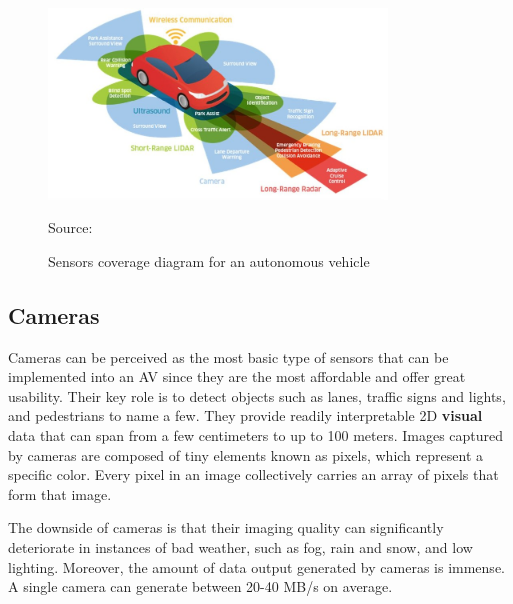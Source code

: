 \documentclass[10pt,oneside,english,a4paper]{article}
\begin{document}
\begin{figure}
\centering
\includegraphics[width=9cm]{SensorsScheme.png}
\caption{Sensors coverage diagram for an autonomous vehicle}
{Source: }
\label{fig:p_sensors}
\end{figure}

\subsection{Cameras}
\indent Cameras can be perceived as the most basic type of sensors that can be implemented into an AV since they are the most affordable and offer great usability. Their key role is to detect objects such as lanes, traffic signs and lights, and pedestrians to name a few. They provide readily interpretable 2D \textbf{visual} data that can span from a few centimeters to up to 100 meters. Images captured by cameras are composed of tiny elements known as pixels, which represent a specific color. Every pixel in an image collectively carries an array of pixels that form that image. 
\par The downside of cameras is that their imaging quality can significantly deteriorate in instances of bad weather, such as fog, rain and snow, and low lighting. Moreover, the amount of data output generated by cameras is immense. A single camera can generate between 20-40 MB/s on average. \cite{functionalarch}\cite{computerarch}\cite{stateoftheart}
\end{document}
